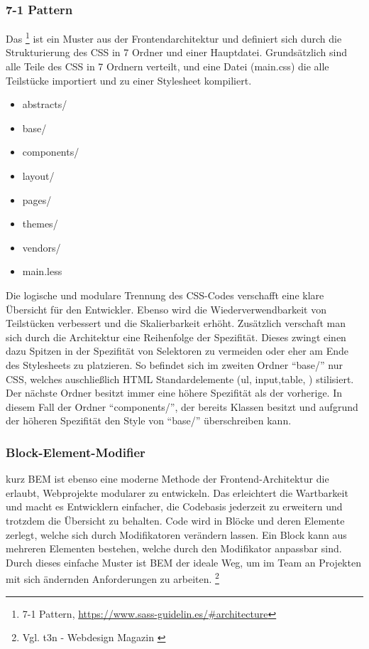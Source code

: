 \subsubsection{7-1 Pattern}
\label{sec:7-1}
Das 
\footnote{7-1 Pattern, \url{https://www.sass-guidelin.es/#architecture}} ist ein
Muster aus der Frontendarchitektur und definiert sich durch die Strukturierung des \ac{CSS} in 7 Ordner und
einer Hauptdatei. Grundsätzlich sind alle Teile des \ac{CSS} in 7 Ordnern
verteilt, und eine Datei (main.css) die alle Teilstücke importiert und zu einer Stylesheet kompiliert.
\begin{multicols}{4}
\begin{itemize}
\item abstracts/
\item base/
\item components/
\item layout/
\item pages/
\item themes/
\item vendors/
\item main.less
\end{itemize}
\end{multicols}
Die logische und modulare Trennung des \ac{CSS}-Codes verschafft eine klare
Übersicht für den Entwickler. Ebenso wird die Wiederverwendbarkeit von
Teilstücken verbessert und die Skalierbarkeit erhöht. Zusätzlich verschaft man
sich durch die Architektur eine Reihenfolge der Spezifität. Dieses zwingt einen
dazu Spitzen in der Spezifität von Selektoren zu vermeiden oder eher
am Ende des Stylesheets zu platzieren. So befindet sich im zweiten Ordner
"`base/"' nur \ac{CSS}, welches auschließlich HTML Standardelemente (\zB ul,
input,table, \usw) stilisiert. Der nächste Ordner besitzt immer eine höhere
Spezifität als der vorherige. In diesem Fall der Ordner "`components/"', der
bereits Klassen besitzt und aufgrund der höheren Spezifität den Style von
"`base/"' überschreiben kann. 
 
\subsubsection{Block-Element-Modifier}
\label{sec:BEM}
 kurz \acs{BEM} ist ebenso eine moderne
Methode der Frontend-Architektur die erlaubt, Webprojekte modularer zu entwickeln.
Das erleichtert die Wartbarkeit und macht es Entwicklern einfacher, die
Codebasis jederzeit zu erweitern und trotzdem die Übersicht zu behalten.
Code wird in Blöcke und deren Elemente zerlegt, welche sich durch Modifikatoren
verändern lassen. Ein Block kann aus mehreren Elementen bestehen, welche durch
den Modifikator anpassbar sind. Durch dieses einfache Muster ist BEM der ideale
Weg, um im Team an Projekten mit sich ändernden Anforderungen zu arbeiten.
 \footnote{Vgl. t3n - Webdesign Magazin \cite{BEM}}
 
